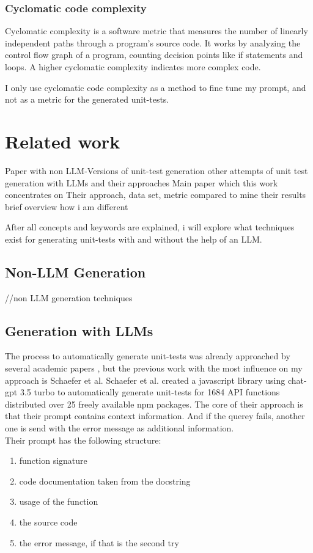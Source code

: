 \documentclass[a4paper,11pt,oneside]{memoir}
\begin{document}
\subsection{Cyclomatic code complexity}
Cyclomatic complexity is a software metric that measures the number of linearly independent paths through a program's source code. It works by analyzing the control flow graph of a program, counting decision points like if statements and loops. A higher cyclomatic complexity indicates more complex code. 

I only use cyclomatic code complexity as a method to fine tune my prompt, and not as a metric for the generated unit-tests.

\chapter{Related work}
\label{RelatedWork}
Paper with non LLM-Versions of unit-test generation
other attempts of unit test generation with LLMs and their approaches
Main paper which this work concentrates on
    Their approach, data set, metric
    compared to mine
    their results
    brief overview how i am different 

After all concepts and keywords are explained, i will explore what techniques exist for generating unit-tests with and without the help of an LLM. 
\section{Non-LLM Generation}
//non LLM generation techniques



\section{Generation with LLMs}
The process to automatically generate unit-tests was already approached by several academic papers\cite{tufanoTestCaseGeneration} \cite{yang2024empiricalstudyunittest}, but the previous work with the most influence on my approach is Schaefer et al.\cite{Schaefer_automated_unit_test_generation}
Schaefer et al. created a javascript library using chat-gpt 3.5 turbo to automatically generate unit-tests for 1684 API functions distributed over 25 freely available npm packages. The core of their approach is that their prompt contains context information. And if the querey fails, another one is send with the error message as additional information. \\Their prompt has the following structure:
\begin{enumerate}
    \item function signature
    \item code documentation taken from the docstring
    \item usage of the function
    \item the source code
    \item the error message, if that is the second try
\end{enumerate}
\end{document}
